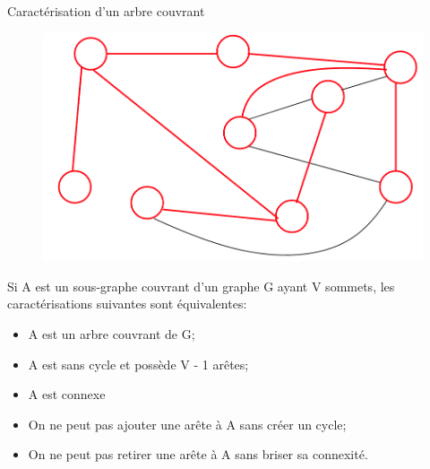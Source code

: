 \documentclass[10pt,xcolor=dvipsnames]{beamer}
\begin{document}
\begin{frame}{Caractérisation d'un arbre couvrant}
    \begin{figure}
        \centering
        \includegraphics[scale=0.10]{figures/CM4/couvrant-1.png}
        \label{fig:my_label}
    \end{figure}
Si A est un sous-graphe couvrant d'un graphe G ayant V sommets, les caractérisations suivantes sont \alert{équivalentes}:
\begin{itemize}
    \item A est un \alert{arbre couvrant} de G;
    \item A est sans cycle et possède V - 1 arêtes;
    \item A est \alert{connexe}
    \item On ne peut pas ajouter une arête à A sans créer un \alert{cycle};
    \item On ne peut pas retirer une arête à A sans briser sa \alert{connexité}.
\end{itemize}
\end{frame}
\end{document}
